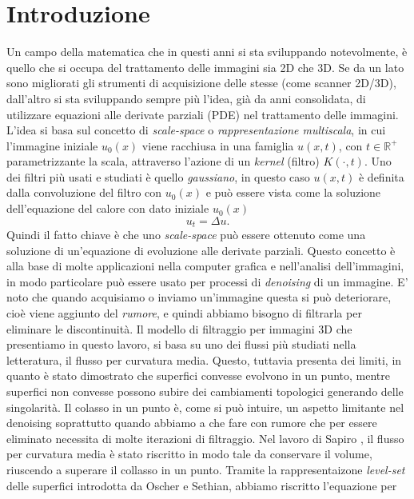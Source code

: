 \chapter*{Introduzione}
{}

Un campo della matematica che in questi anni si sta sviluppando
notevolmente, è quello che si occupa del trattamento delle immagini
sia 2D che 3D. Se da un lato sono migliorati gli strumenti di
acquisizione delle stesse (come  scanner 2D/3D), dall'altro si sta
sviluppando sempre più l'idea, già da anni consolidata, di utilizzare
equazioni alle derivate parziali (PDE) nel trattamento delle
immagini. L'idea si basa sul concetto di \emph{scale-space} o
\emph{rappresentazione multiscala}, in cui l'immagine
iniziale $u_0(x)$ viene racchiusa in una famiglia $u(x,t)$, con
$t\in\mathbb{R}^+$ parametrizzante la scala, attraverso l'azione di un
\emph{kernel} (filtro) $K(\cdot,t)$. Uno dei filtri più
usati  e studiati è quello \emph{gaussiano}, in questo caso  $u(x,t)$
è definita dalla convoluzione del filtro con $u_0(x)$ e può essere
vista come la soluzione dell'equazione del calore con dato iniziale $u_0(x)$
\[
u_t=\Delta u.
\]
Quindi il fatto chiave è che uno \emph{scale-space} può essere
ottenuto come una soluzione di un'equazione di evoluzione alle
derivate parziali. Questo concetto è alla base di molte applicazioni
nella computer grafica e nell'analisi dell'immagini, in modo
particolare può essere usato per processi di \emph{denoising} di un
immagine. E' noto che quando acquisiamo o inviamo un'immagine questa
si può deteriorare, cioè  viene aggiunto del \emph{rumore}, e quindi
abbiamo bisogno di filtrarla per eliminare le discontinuità. Il
modello di filtraggio per immagini 3D che presentiamo in questo
lavoro, si basa su uno dei flussi più studiati nella letteratura, il
flusso per curvatura media. Questo, tuttavia presenta dei limiti, in
quanto è stato dimostrato che superfici convesse evolvono in un punto,
mentre superfici non convesse possono subire dei cambiamenti topologici
generando delle singolarità. Il colasso in un punto è, come si può
intuire, un aspetto limitante nel denoising soprattutto quando abbiamo
a che fare con rumore che per essere eliminato necessita di molte iterazioni
di filtraggio. Nel lavoro di Sapiro \cite[][]{gui:sapiro}, il
flusso per curvatura media è stato riscritto in modo tale da
conservare il volume, riuscendo a superare il collasso in un
punto. Tramite la rappresentaizone \emph{level-set} delle superfici
introdotta da Oscher e Sethian, abbiamo riscritto l'equazione per
